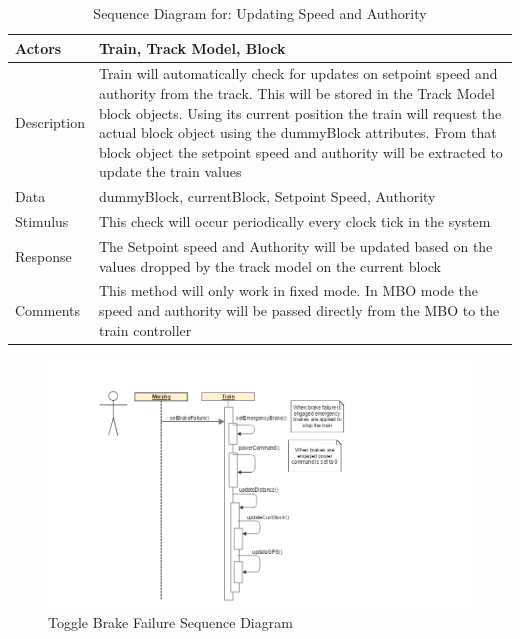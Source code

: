 \documentclass[]{article}
\begin{document}
\begin{table}[H]
	\centering
	\caption{Sequence Diagram for: Updating Speed and Authority}
	\begin{tabular}{|l|l|}
		\hline
		Actors & \parbox[t]{10cm}{Train, Track Model, Block} \\ \hline
		Description & \parbox[t]{10cm}{Train will automatically check for updates on setpoint speed and authority from the track. This will be stored in the Track Model block objects. Using its current position the train will request the actual block object using the dummyBlock attributes. From that block object the setpoint speed and authority will be extracted to update the train values} \\ \hline
		Data &  \parbox[t]{10cm}{dummyBlock, currentBlock, Setpoint Speed, Authority } \\ \hline
		Stimulus &  \parbox[t]{10cm}{This check will occur periodically every clock tick in the system} \\ \hline
		Response & \parbox[t]{10cm}{The Setpoint speed and Authority will be updated based on the values dropped by the track model on the current block}\\ \hline
		Comments & \parbox[t]{10cm}{This method will only work in fixed mode. In MBO mode the speed and authority will be passed directly from the MBO to the train controller}  \\ \hline
	\end{tabular}
\end{table}

\begin{figure}[H]
	\centering
	\includegraphics[scale=.5]{train_model_sqd_toggle_brake_failure.png}
	\caption{Toggle Brake Failure Sequence Diagram}
\end{figure}
\end{document}
